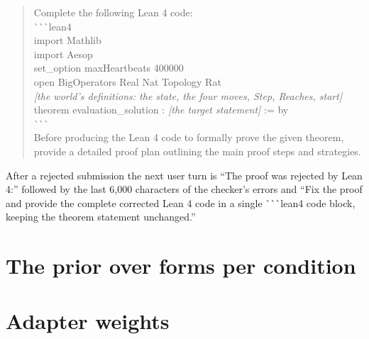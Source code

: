 \documentclass[11pt]{article}
\begin{document}
\begin{quote}\footnotesize\ttfamily\raggedright
Complete the following Lean 4 code:\\[2pt]
\`{}\`{}\`{}lean4\\
import Mathlib\\
import Aesop\\
set\_option maxHeartbeats 400000\\
open BigOperators Real Nat Topology Rat\\[2pt]
\textrm{\emph{[the world's definitions: the state, the four moves, Step, Reaches, start]}}\\[2pt]
theorem evaluation\_solution : \textrm{\emph{[the target statement]}} := by\\
\`{}\`{}\`{}\\[2pt]
Before producing the Lean 4 code to formally prove the given theorem,
provide a detailed proof plan outlining the main proof steps and
strategies.
\end{quote}

After a rejected submission the next user turn is ``The proof was rejected
by Lean 4:'' followed by the last 6,000 characters of the checker's
errors and ``Fix the proof and provide the complete corrected Lean 4 code
in a single \`{}\`{}\`{}lean4 code block, keeping the theorem statement
unchanged.''

\section{The prior over forms per condition}
\label{app:pitheta}

\begin{table}[!htbp]
\centering\footnotesize
\setlength{\tabcolsep}{4pt}
\resizebox{0.93\textwidth}{!}{}
\caption{The prior over forms ($\pi$: the needed kind at the first submission) and execution ($\theta$: solve rate given the first kind), median and 90\% interval of a Bayesian bootstrap over instances. ``sat.'': every session of every instance has (or lacks) the kind; the printed value is the smoothing floor rather than an estimate. A dash: fewer than three sessions in that cell.}
\label{tab:a6}
\end{table}

\clearpage
\section{Adapter weights}
\label{app:adapters}
\end{document}
